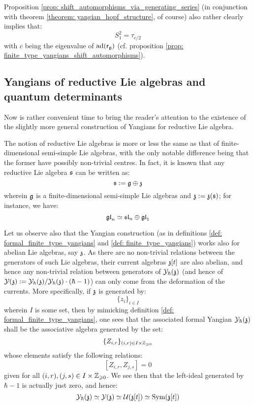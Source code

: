         \begin{remark}
            Proposition \ref{prop: shift_automorphisms_via_generating_series} (in conjunction with theorem \ref{theorem: yangian_hopf_structure}, of course) also rather clearly implies that:
                $$S_1^2 = \tau_{c/2}$$
            with $c$ being the eigenvalue of $\mathrm{ad}(\mathsf{r}_{\mathfrak{g}})$ (cf. proposition \ref{prop: finite_type_yangians_shift_automorphisms}).
        \end{remark}

    \subsection{Yangians of reductive Lie algebras and quantum determinants} \label{subsection: yangians_of_reductive_lie_algebras}
        Now is rather convenient time to bring the reader's attention to the existence of the slightly more general construction of Yangians for reductive Lie algebra.

        The notion of reductive Lie algebras is more or less the same as that of finite-dimensional semi-simple Lie algebras, with the only notable difference being that the former have possibly non-trivial centres. In fact, it is known that any reductive Lie algebra $\mathfrak{s}$ can be written as:
            $$\mathfrak{s} := \mathfrak{g} \oplus \mathfrak{z}$$
        wherein $\mathfrak{g}$ is a finite-dimensional semi-simple Lie algebras and $\mathfrak{z} := \mathfrak{z}(\mathfrak{s})$; for instance, we have:
            $$\mathfrak{gl}_n \simeq \mathfrak{sl}_n \oplus \mathfrak{gl}_1$$

        Let us observe also that the Yangian construction (as in definitions \ref{def: formal_finite_type_yangians} and \ref{def: finite_type_yangians}) works also for abelian Lie algebras, say $\mathfrak{z}$. As there are no non-trivial relations between the generators of such Lie algebras, their current algebras $\mathfrak{z}[t]$ are also abelian, and hence any non-trivial relation between generators of $\mathcal{Y}_{\hbar}(\mathfrak{z})$ (and hence of $\mathcal{Y}(\mathfrak{z}) := \mathcal{Y}_{\hbar}(\mathfrak{z})/\mathcal{Y}_{\hbar}(\mathfrak{z}) \cdot (\hbar - 1)$) can only come from the deformation of the currents. More specifically, if $\mathfrak{z}$ is generated by:
            $$\{z_i\}_{i \in I}$$
        wherein $I$ is some set, then by mimicking definition \ref{def: formal_finite_type_yangians}, one sees that the associated formal Yangian $\mathcal{Y}_{\hbar}(\mathfrak{z})$ shall be the associative algebra generated by the set:
            $$\{Z_{i, r}\}_{(i, r) \in I \x \Z_{\geq 0}}$$
        whose elements satisfy the following relations:
            $$[ Z_{i, r}, Z_{j, s} ] = 0$$
        given for all $(i, r), (j, s) \in I \x \Z_{\geq 0}$. We see then that the left-ideal generated by $\hbar - 1$ is actually just zero, and hence:
            $$\mathcal{Y}_{\hbar}(\mathfrak{z}) \simeq \mathcal{Y}(\mathfrak{z}) \simeq \mathcal{U}(\mathfrak{z}[t]) \simeq \mathrm{Sym}(\mathfrak{z}[t])$$

